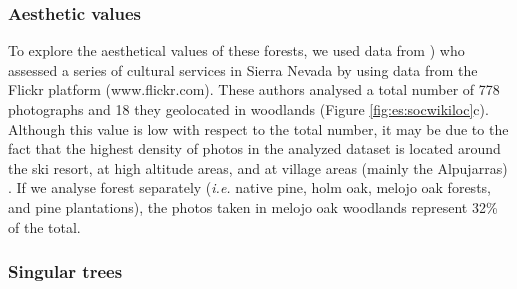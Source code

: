 \subsubsection{Aesthetic values}\label{sec:es:cultural-aesthetic} 
To explore the aesthetical values of these forests, we used data from \citet{MorenoLlorcaetal2020EvaluatingTourist}) who assessed a series of cultural services in Sierra Nevada by using data from the Flickr platform (www.flickr.com). These authors analysed a total number of 778 photographs and 18 they geolocated in \Qp woodlands (Figure \ref{fig:es:socwikiloc}c). Although this value is low with respect to the total number, it may be due to the fact that the highest density of photos in the analyzed dataset is located around the ski resort, at high altitude areas, and at village areas (mainly the Alpujarras) \autocites{RosCandeiraetal2020SocialMedia}. If we analyse forest separately (\emph{i.e.} native pine, holm oak, melojo oak forests, and pine plantations), the photos taken in melojo oak woodlands represent 32\% of the total.

\subsubsection{Singular trees}\label{sec:es:cultural-trees} 

